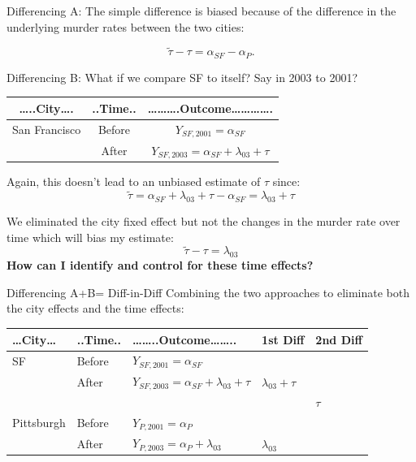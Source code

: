 \documentclass[
  ignorenonframetext,
]{beamer}
\begin{document}
\begin{frame}{Differencing A:}
\protect\hypertarget{differencing-a-1}{}
The simple difference is biased because of the difference in the
underlying murder rates between the two cities:

\[
\tilde{\tau}-\tau=\alpha_{SF}-\alpha_{P}. 
\]
\end{frame}

\begin{frame}{Differencing B:}
\protect\hypertarget{differencing-b}{}
What if we compare SF to itself? Say in 2003 to 2001?

\begin{longtable}[]{@{}ccc@{}}
\toprule
\ldots..City\ldots. & ..Time.. &
\ldots\ldots\ldots.Outcome\ldots\ldots\ldots\ldots. \\
\midrule
\endhead
San Francisco & Before & \(Y_{SF,2001}=\alpha_{SF}\) \\
& After & \(Y_{SF,2003}=\alpha_{SF}+\lambda_{03}+\tau\) \\
\bottomrule
\end{longtable}

Again, this doesn't lead to an unbiased estimate of \(\tau\) since: \[
\tilde{\tau}=\alpha_{SF}+\lambda_{03}+\tau-\alpha_{SF}=\lambda_{03}+\tau
\]

We eliminated the city fixed effect but not the changes in the murder
rate over time which will bias my estimate: \[
\tilde{\tau}-\tau=\lambda_{03}
\] \textbf{How can I identify and control for these time effects?}
\end{frame}

\begin{frame}{Differencing A+B= Diff-in-Diff}
\protect\hypertarget{differencing-ab-diff-in-diff}{}
Combining the two approaches to eliminate both the city effects and the
time effects:

\begin{longtable}[]{@{}lllll@{}}
\toprule
\ldots City\ldots{} & ..Time.. & \ldots\ldots..Outcome\ldots\ldots.. &
1st Diff & 2nd Diff \\
\midrule
\endhead
SF & Before & \(Y_{SF,2001}=\alpha_{SF}\) & & \\
& After & \(Y_{SF,2003}=\alpha_{SF}+\lambda_{03}+\tau\) &
\(\lambda_{03}+\tau\) & \\
& & & & \(\tau\) \\
Pittsburgh & Before & \(Y_{P,2001}=\alpha_{P}\) & & \\
& After & \(Y_{P,2003}=\alpha_{P}+\lambda_{03}\) & \(\lambda_{03}\) & \\
\bottomrule
\end{longtable}
\end{frame}
\end{document}
